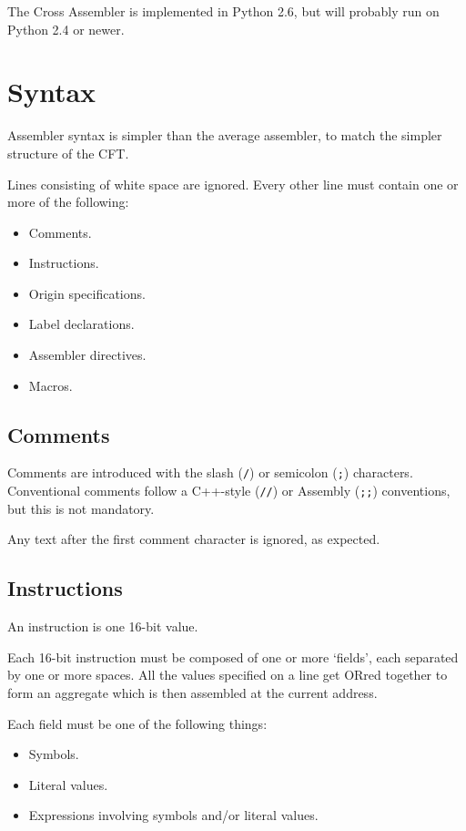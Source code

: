 \documentclass[11pt,a4paper,twocolumns]{article}
\newcommand\f[1]{{\color{black}\texttt{#1}}}
\begin{document}
The Cross Assembler is implemented in Python 2.6, but will probably
run on Python 2.4 or newer. 

\section{Syntax}

Assembler syntax is simpler than the average assembler, to match the
simpler structure of the CFT.

Lines consisting of white space are ignored. Every other line must
contain one or more of the following:

\begin{itemize}
\item Comments.
\item Instructions.
\item Origin specifications.
\item Label declarations.
\item Assembler directives.
\item Macros.
\end{itemize}

\subsection{Comments}

Comments are introduced with the slash (\f{/}) or semicolon (\f{;})
characters. Conventional comments follow a C++-style (\f{//}) or Assembly
(\f{;;}) conventions, but this is not mandatory.

Any text after the first comment character is ignored, as expected.

\subsection{Instructions}

An instruction is one 16-bit value.

Each 16-bit instruction must be composed of one or more ‘fields’, each
separated by one or more spaces. All the values specified on a line get ORred
together to form an aggregate which is then assembled at the current address.

Each field must be one of the following things:

\begin{itemize}
  \item Symbols.
  \item Literal values.
  \item Expressions involving symbols and/or literal values.
\end{itemize}
\end{document}

